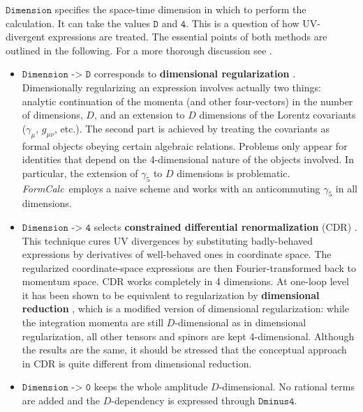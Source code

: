 \documentclass[twoside,11pt]{article}
\makeatletter
\def\indextt#1{\index{#1@\texttt{#1}}}
\def\FC{\textit{FormCalc}}
\def\Code#1{\ensuremath{\texttt{#1}}}
\makeatother
\begin{document}
%
%
%
%
%
\Code{Dimension} specifies the space-time dimension in which to perform
the calculation.  It can take the values \Code{D} and \Code{4}.  This is a
question of how UV-divergent expressions are treated.  The essential 
points of both methods are outlined in the following.  For a more thorough
discussion see \cite{HaP98}.
\begin{itemize}
\item	\Code{Dimension -> D} corresponds to \textbf{dimensional
	regularization} \cite{tHV72}.  Dimensionally regularizing an
	expression involves actually two things: analytic continuation of
	the momenta (and other four-vectors) in the number of dimensions,
	$D$, and an extension to $D$ dimensions of the Lorentz covariants
	($\gamma_\mu$, $g_{\mu\nu}$, etc.).  The second part is achieved
	by treating the covariants as formal objects obeying certain
	algebraic relations.  Problems only appear for identities that
	depend on the 4-dimensional nature of the objects involved.  In
	particular, the extension of $\gamma_5$ to $D$ dimensions is
	problematic.  \FC\ employs a naive scheme \cite{ChFH79} and works
	with an anticommuting $\gamma_5$ in all	dimensions.

\item	\Code{Dimension -> 4} selects \textbf{constrained differential 
	renormalization} (CDR) \cite{dACTP98}.  This technique cures UV 
	divergences by substituting badly-behaved expressions by 
	derivatives of well-behaved ones in coordinate space.  The 
	regularized coordinate-space expressions are then 
	Fourier-transformed back to momentum space.  CDR works completely 
	in 4 dimensions.  At one-loop level it has been shown \cite{HaP98} 
	to be equivalent to regularization by \textbf{dimensional reduction} 
	\cite{Si79}, which is a modified version of dimensional 
	regularization: while the integration momenta are still 
	$D$-dimensional as in dimensional regularization, all other 
	tensors and spinors are kept 4-dimensional.  Although the results 
	are the same, it should be stressed that the conceptual approach 
	in CDR is quite different from dimensional reduction.

\item	\Code{Dimension -> 0} keeps the whole amplitude $D$-dimensional.
	No rational terms are added and the $D$-dependency is expressed
	through \Code{Dminus4}.
\end{itemize}%
\indextt{Dminus4}
\end{document}
